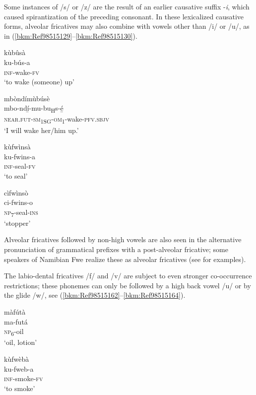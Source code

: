 Some instances of /s/ or /z/ are the result of an earlier causative suffix \nobreakdash-\textit{i}, which caused spirantization of the preceding consonant. In these lexicalized causative forms, alveolar fricatives may also combine with vowels other than /i/ or /u/, as in (\ref{bkm:Ref98515129}--\ref{bkm:Ref98515130}).

\ea
\label{bkm:Ref98515129}
\glll kùbûsà\\
ku-bús-a\\
\textsc{inf}-wake-\textsc{fv}\\
\glt ‘to wake (someone) up’
\z

\ea
\glll mbòndímùbúsè\\
mbo-ndí̲-mu-bu\textsubscript{H}s-é̲\\
\textsc{near}.\textsc{fut}-\textsc{sm}\textsubscript{1SG}-\textsc{om}\textsubscript{1}-wake-\textsc{pfv}.\textsc{sbjv}\\
\glt ‘I will wake her/him up.’
\z

\ea
\glll kùfwìnsà\\
ku-fwins-a\\
\textsc{inf}-seal-\textsc{fv}\\
\glt ‘to seal’
\z

\ea
\label{bkm:Ref98515130}
\glll cìfwìnsò\\
ci-fwins-o\\
\textsc{np}\textsubscript{7}-seal-\textsc{ins}\\
\glt ‘stopper’
\z

Alveolar fricatives followed by non-high vowels are also seen in the alternative pronunciation of grammatical prefixes with a post-alveolar fricative; some speakers of Namibian Fwe realize these as alveolar fricatives (see  for examples).

\hspace*{-2.65pt}The labio-dental fricatives /f/ and /v/ are subject to even stronger co-occurrence restrictions; these phonemes can only be followed by a high back vowel /u/ or by the glide /w/, see (\ref{bkm:Ref98515162}--\ref{bkm:Ref98515164}).

\ea
\label{bkm:Ref98515162}
\glll màfútà\\
ma-futá\\
\textsc{np}\textsubscript{6}-oil\\
\glt ‘oil, lotion’
\z

\ea
\glll kùfwèbà\\
ku-fweb-a\\
\textsc{inf}-smoke-\textsc{fv}\\
\glt ‘to smoke’
\z

